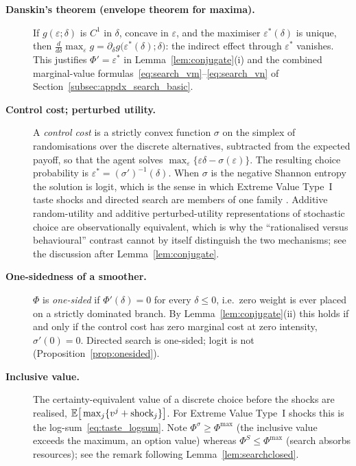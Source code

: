 \begin{description}
\item[\textnormal{\textbf{Danskin's theorem (envelope theorem for maxima).}}]
If $g(\varepsilon;\delta)$ is $C^{1}$ in $\delta$, concave in $\varepsilon$, and the
maximiser $\varepsilon^{\ast}(\delta)$ is unique, then
$\tfrac{d}{d\delta}\max_{\varepsilon}g=\partial_{\delta}g\big(\varepsilon^{\ast}(\delta);\delta\big)$:
the indirect effect through $\varepsilon^{\ast}$ vanishes. This justifies
$\Phi'=\varepsilon^{\ast}$ in Lemma~\ref{lem:conjugate}(i) and the combined
marginal-value formulas~\eqref{eq:search_vm}--\eqref{eq:search_vn} of
Section~\ref{subsec:appdx_search_basic}.

\item[\textnormal{\textbf{Control cost; perturbed utility.}}]
A \emph{control cost} is a strictly convex function $\sigma$ on the simplex of
randomisations over the discrete alternatives, subtracted from the expected payoff, so
that the agent solves $\max_{\varepsilon}\{\varepsilon\delta-\sigma(\varepsilon)\}$. The
resulting choice probability is $\varepsilon^{\ast}=(\sigma')^{-1}(\delta)$. When
$\sigma$ is the negative Shannon entropy the solution is logit, which is the sense in
which Extreme Value Type~I taste shocks and directed search are members of one family
\citep{Mattsson2002-pc,Hofbauer2002-gc,Fudenberg2015-sv}. Additive random-utility and
additive perturbed-utility representations of stochastic choice are observationally
equivalent, which is why the ``rationalised versus behavioural'' contrast cannot by
itself distinguish the two mechanisms; see the discussion after
Lemma~\ref{lem:conjugate}.

\item[\textnormal{\textbf{One-sidedness of a smoother.}}]
$\Phi$ is \emph{one-sided} if $\Phi'(\delta)=0$ for every $\delta\le0$, i.e.\ zero weight
is ever placed on a strictly dominated branch. By Lemma~\ref{lem:conjugate}(ii) this
holds if and only if the control cost has zero marginal cost at zero intensity,
$\sigma'(0)=0$. Directed search is one-sided; logit is not
(Proposition~\ref{prop:onesided}).

\item[\textnormal{\textbf{Inclusive value.}}]
The certainty-equivalent value of a discrete choice before the shocks are realised,
$\mathbb{E}\big[\max_j\{v^{j}+\text{shock}_j\}\big]$. For Extreme Value Type~I shocks this is
the log-sum~\eqref{eq:taste_logsum}. Note $\Phi^{\sigma}\ge\Phi^{\max}$ (the inclusive
value exceeds the maximum, an option value) whereas $\Phi^{S}\le\Phi^{\max}$ (search
absorbs resources); see the remark following Lemma~\ref{lem:searchclosed}.

\end{description}


